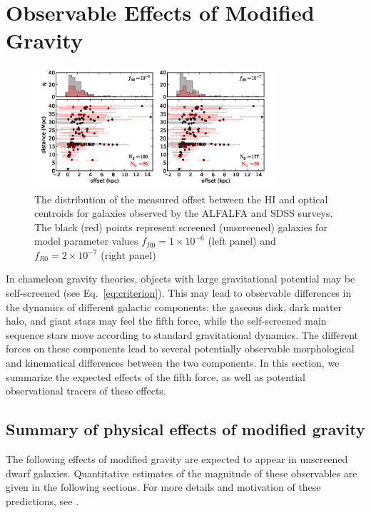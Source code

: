 \documentclass[twocolappendix, numberedappendix]{emulateapj}
\begin{document}
\section{Observable Effects of Modified Gravity}
\label{sec:test-summary} 

\begin{figure}[t]
\centering
\includegraphics[width=0.8\textwidth]{figures/Offset_HI_optical_scatter_jake.png}
\caption{The distribution of the measured offset between the HI and
optical centroids for galaxies observed by the ALFALFA and SDSS surveys.
The black (red) points represent screened (unscreened) galaxies for model
parameter values 
$f_{R0}=1\times10^{-6}$ (left panel) and $f_{R0}=2\times10^{-7}$ (right panel)}
\label{fig:offset}
\end{figure}


In chameleon gravity theories, objects with large gravitational potential
may be self-screened (see Eq.~\ref{eq:criterion}).  This may lead to observable
differences in the dynamics of different galactic components:  
the gaseous disk, dark matter halo, and giant
stars may feel the fifth force, while the self-screened main sequence
stars move according to standard gravitational dynamics.
The different forces on these components lead to several potentially observable
morphological and kinematical differences between the two components. In
this section, we summarize the expected effects of the fifth force, as well
as potential observational tracers of these effects.


\subsection{Summary of physical effects of modified gravity}
The following effects of modified gravity are expected to appear in 
unscreened dwarf galaxies.
Quantitative estimates of the magnitude of these
observables are given in the following sections.
For more details and motivation of these predictions, see \citet{bhuvjake2011}. 
\end{document}

